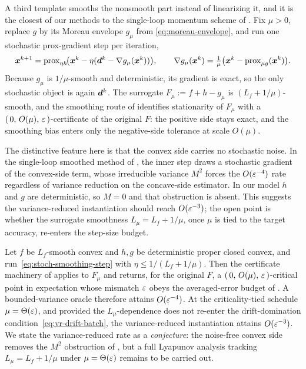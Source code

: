A third template smooths the nonsmooth part instead of linearizing it,
and it is the closest of our methods to the single-loop momentum scheme
of \citet{chayti2025stochastic}. Fix $\mu>0$, replace $g$ by its Moreau
envelope $g_\mu$ from \eqref{eq:moreau-envelope}, and run one stochastic
prox-gradient step per iteration,
\begin{equation}
    \bm{x}^{k+1}
    =\mathrm{prox}_{\eta h}\!\bigl(\bm{x}^k-\eta(\bm{d}^k-\nabla g_\mu(\bm{x}^k))\bigr),
    \qquad
    \nabla g_\mu(\bm{x}^k)=\tfrac1\mu\bigl(\bm{x}^k-\mathrm{prox}_{\mu g}(\bm{x}^k)\bigr).
    \label{eq:stoch-smoothing-step}
\end{equation}
Because $g_\mu$ is $1/\mu$-smooth and deterministic, its gradient is
exact, so the only stochastic object is again $\bm{d}^k$. The surrogate
$F_\mu:=f+h-g_\mu$ is $(L_f+1/\mu)$-smooth, and the smoothing route of
 identifies stationarity of $F_\mu$ with a
$(\,0,\,O(\mu),\,\varepsilon\,)$-certificate of the original $F$: the positive
side stays exact, and the smoothing bias enters only the negative-side
tolerance at scale $O(\mu)$.

The distinctive feature here is that the convex side carries no stochastic
noise. In the single-loop smoothed method of \citet{chayti2025stochastic},
the inner step draws a stochastic gradient of the convex-side term, whose
irreducible variance $M^2$ forces the $O(\varepsilon^{-4})$ rate regardless of
variance reduction on the concave-side estimator. In our model $h$ and $g$
are deterministic, so $M=0$ and that obstruction is absent. This suggests
the variance-reduced instantiation should reach $O(\varepsilon^{-3})$; the open
point is whether the surrogate smoothness $L_\mu=L_f+1/\mu$, once $\mu$ is
tied to the target accuracy, re-enters the step-size budget.

\begin{proposition}
\label{prop:stoch-smoothing-rate}
Let $f$ be $L_f$-smooth convex and $h,g$ be deterministic proper closed
convex, and run~\eqref{eq:stoch-smoothing-step} with
$\eta\le 1/(L_f+1/\mu)$. Then the certificate machinery of
 applies to
$F_\mu$ and returns, for the original $F$, a $(\,0,\,O(\mu),\,\varepsilon\,)$-critical
point in expectation whose mismatch $\varepsilon$ obeys the averaged-error budget
of . A bounded-variance oracle therefore
attains $O(\varepsilon^{-4})$. At the criticality-tied schedule $\mu=\Theta(\varepsilon)$,
and provided the $L_\mu$-dependence does not re-enter the
drift-domination condition~\eqref{eq:vr-drift-batch}, the variance-reduced
instantiation attains $O(\varepsilon^{-3})$. We state the variance-reduced rate
as a \emph{conjecture}: the noise-free convex side removes the $M^2$
obstruction of \citet{chayti2025stochastic}, but a full Lyapunov analysis
tracking $L_\mu=L_f+1/\mu$ under $\mu=\Theta(\varepsilon)$ remains to be carried
out.
\end{proposition}

